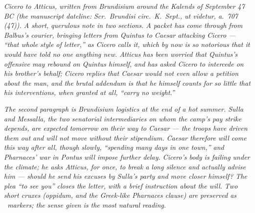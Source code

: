 
\textit{Cicero to Atticus, written from Brundisium around
the Kalends of September 47 BC (the manuscript dateline:
\textit{Scr.\ Brundisi circ.\ K.\ Sept., ut videtur, a.\
707 (47)}). A short, querulous note in two sections.
A packet has come through from Balbus's courier, bringing
letters from Quintus to Caesar attacking Cicero ---
``that whole style of letter,'' as Cicero calls it,
which by now is so notorious that it would have told
no one anything new. Atticus has been worried that
Quintus's offensive may rebound on Quintus himself,
and has asked Cicero to intercede on his brother's
behalf; Cicero replies that Caesar would not even
\textit{allow} a petition about the man, and the
brutal addendum is that he himself counts for so little
that his interventions, when granted at all, ``carry
no weight.''}

\textit{The second paragraph is Brundisium logistics
at the end of a hot summer. Sulla and Messalla, the
two senatorial intermediaries on whom the camp's pay
strike depends, are expected tomorrow on their way
to Caesar --- the troops have driven them out and
will not move without their stipendium. Caesar
therefore will come this way after all, though slowly,
``spending many days in one \dag town\dag,'' and
Pharnaces' war in Pontus will impose further delay.
Cicero's body is failing under the climate; he asks
Atticus, for once, to break a long silence and actually
\textit{advise} him --- should he send his excuses
by Sulla's party and move closer himself? The plea
``to see you'' closes the letter, with a brief
instruction about the will. Two short cruxes
(\dag oppidum\dag, and the Greek-like Pharnaces clause)
are preserved as \dag\ markers; the sense given is
the most natural reading.}
